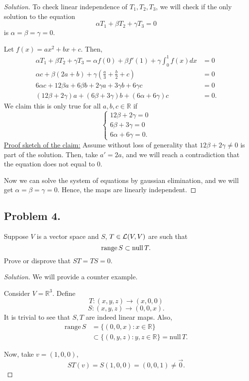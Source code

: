 \documentclass{article}
\begin{document}
\begin{proof}[Solution]
    To check linear independence of $T_1, T_2, T_3$, we will check if the only solution to the equation 
    $$\alpha T_1 + \beta T_2 + \gamma T_3 = 0$$ is $\alpha = \beta = \gamma = 0$.

    Let $f(x) = ax^2 + bx + c$. Then,
    \begin{align*}
        \alpha T_1 + \beta T_2 + \gamma T_3 = \alpha f(0) + \beta f'(1) + \gamma \int_{0}^1 f(x) dx & = 0 \\
        \alpha c + \beta (2a + b) + \gamma \left(\frac{a}{3} + \frac{b}{2} + c\right) & = 0 \\
        6\alpha c + 12\beta a + 6\beta b + 2\gamma a + 3\gamma b + 6\gamma c & = 0 \\
        (12\beta + 2\gamma)a + (6\beta + 3\gamma)b + (6\alpha + 6\gamma)c & = 0.
    \end{align*}
    We claim this is only true for all $a, b, c \in \mathbb{R}$ if 
    $$\begin{cases}
        12\beta + 2\gamma = 0 \\
        6\beta + 3\gamma = 0 \\
        6\alpha + 6\gamma = 0.
    \end{cases}$$
    \underline{Proof sketch of the claim:} Assume without loss of generality that 
    $12\beta + 2\gamma \neq 0$ is part of the solution. Then, take $a' = 2a$, and we will reach a 
    contradiction that the equation does not equal to 0.

    Now we can solve the system of equations by gaussian elimination, and we will get 
    $\alpha = \beta = \gamma = 0$. Hence, the maps are linearly independent.
\end{proof}

\newpage
\subsection*{Problem 4.}
Suppose $V$ is a vector space and $S$, $T \in {\cal L}(V,V)$ are such that
$$  {\rm range} \, S \subset {\rm null}\, T.$$
Prove or disprove that $ST=TS=0$.

\begin{proof}[Solution]
    We will provide a counter example.

    Consider $V = \mathbb{R}^3$. Define 
    $$T: (x,y,z) \rightarrow (x, 0, 0)$$
    $$S: (x,y,z) \rightarrow (0, 0, x).$$
    It is trivial to see that $S, T$ are indeed linear maps. Also, 
    \begin{align*}
        \mathrm{range}\, S & = \{(0,0,x):x\in\mathbb{R}\} \\
        & \subset \{(0,y,z):y, z\in\mathbb{R}\} = \mathrm{null}\, T.
    \end{align*}

    Now, take $v = (1, 0, 0)$,
    $$ST(v) = S(1, 0, 0) = (0,0,1) \neq \vec{0}.$$
\end{proof}
\end{document}

